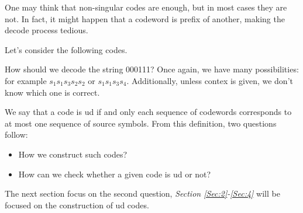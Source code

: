 \documentclass{subfiles}
\begin{document}
    One may think that non-singular codes are enough, 
        but in most cases they are not.
        In fact, it might happen that a codeword is prefix of another,
        making the decode process tedious.
    \begin{example*}
        Let's consider the following codes.
        
        How should we decode the string 000111? 
        Once again, we have many possibilities:
            for example \(s_{1}s_{1}s_{3}s_{2}s_{2}\) or \(s_{1}s_{1}s_{3}s_{4}\).
        Additionally, unless contex is given, we don't know which one is correct.
    \end{example*}
    We say that a code is \gls{ud} if and only each sequence of codewords
        corresponds to at most one sequence of source symbols.
        From this definition, two questions follow:
        \begin{itemize}
            \item How we construct such codes?
            \item How can we check whether a given code is \gls{ud} or not?
        \end{itemize}

    The next section focus on the second question, 
        \emph{Section \ref{Sec:2}-\ref{Sec:4}} will be focused on the construction of \gls{ud} codes.
\end{document}
